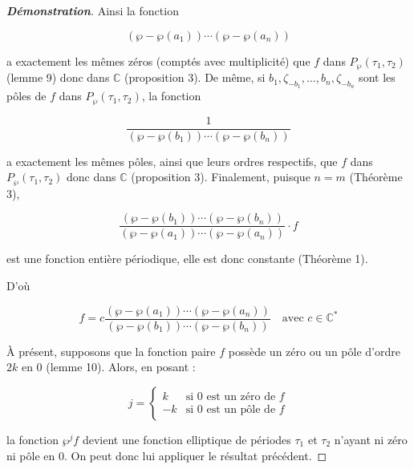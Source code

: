 \documentclass[12pt]{article}
\begin{document}
\begin{proof}[\textbf{Démonstration}]
                    Ainsi la fonction 
                    
                    \[
                    (\wp - \wp(a_1)) \cdots (\wp - \wp(a_n))
                    \]
                    
                    a exactement les mêmes zéros (comptés avec multiplicité) que \(f\) dans \(P_{\wp}(\tau_1, \tau_2)\) (lemme 9) donc dans \(\mathbb{C}\) (proposition 3). De même, si \(b_1, \zeta_{-b_1}, \ldots, b_n, \zeta_{-b_n}\) sont les pôles de \(f\) dans \(P_{\wp}(\tau_1, \tau_2)\), la fonction 
                    
                    \[
                    \frac{1}{(\wp - \wp(b_1)) \cdots (\wp - \wp(b_n))}
                    \]
                    
                    a exactement les mêmes pôles, ainsi que leurs ordres respectifs, que \(f\) dans \(P_{\wp}(\tau_1, \tau_2)\) donc dans \(\mathbb{C}\) (proposition 3). Finalement, puisque \(n = m\) (Théorème 3),
                    
                    \[
                    \frac{(\wp - \wp(b_1)) \cdots (\wp - \wp(b_n))}{(\wp - \wp(a_1)) \cdots (\wp - \wp(a_n))} \cdot f
                    \]
                    
                    est une fonction entière périodique, elle est donc constante (Théorème 1).
                    
                    D'où
                    
                    \[
                    f = c \frac{(\wp - \wp(a_1)) \cdots (\wp - \wp(a_n))}{(\wp - \wp(b_1)) \cdots (\wp - \wp(b_n))} \quad \text{avec } c \in \mathbb{C}^*
                    \]
                    
                    À présent, supposons que la fonction paire \(f\) possède un zéro ou un pôle d'ordre \(2k\) en 0 (lemme 10). Alors, en posant :
                    
                    \[
                    j = \begin{cases} 
                        k & \text{si } 0 \text{ est un zéro de } f \\
                        -k & \text{si } 0 \text{ est un pôle de } f 
                        \end{cases}
                    \]
                    
                    la fonction \(\wp^j f\) devient une fonction elliptique de périodes \(\tau_1\) et \(\tau_2\) n’ayant ni zéro ni pôle en 0. On peut donc lui appliquer le résultat précédent.
                    

\end{proof}
\end{document}
